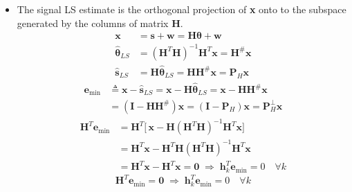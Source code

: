 \begin{itemize}
\[
\hat{\boldsymbol{\theta}}_{ML}
\in \mathcal{N}\big(\boldsymbol{\theta}, CRB(\boldsymbol{\theta})\big)
\]

\item The signal LS estimate is the orthogonal projection of \textbf{x} onto to the subspace generated by the columns of matrix \textbf{H}.
\begin{align*}
\mathbf{x}
&= \mathbf{s} + \mathbf{w}
 = \mathbf{H}\boldsymbol{\theta} + \mathbf{w} \\[4pt]
\hat{\boldsymbol{\theta}}_{LS}
&= (\mathbf{H}^{T}\mathbf{H})^{-1}\mathbf{H}^{T}\mathbf{x}
 = \mathbf{H}^{\#}\mathbf{x} \\[4pt]
\hat{\mathbf{s}}_{LS}
&= \mathbf{H}\hat{\boldsymbol{\theta}}_{LS}
 = \mathbf{H}\mathbf{H}^{\#}\mathbf{x}
 = \mathbf{P}_{\!H}\mathbf{x}
\end{align*}
\vspace{-1.5em}
\begin{align*}
\mathbf{e}_{\min}
&\triangleq \mathbf{x} - \hat{\mathbf{s}}_{LS}
 = \mathbf{x} - \mathbf{H}\hat{\boldsymbol{\theta}}_{LS}
 = \mathbf{x} - \mathbf{H}\mathbf{H}^{\#}\mathbf{x} \\[4pt]
&= (\mathbf{I} - \mathbf{H}\mathbf{H}^{\#})\mathbf{x}
 = (\mathbf{I} - \mathbf{P}_{\!H})\mathbf{x}
 = \mathbf{P}_{\!H}^{\perp}\mathbf{x}
\end{align*}
\vspace{-1.5em}
\begin{align*}
\mathbf{H}^{T}\mathbf{e}_{\min}
&= \mathbf{H}^{T}
   \Big[\, \mathbf{x}
        - \mathbf{H}(\mathbf{H}^{T}\mathbf{H})^{-1}\mathbf{H}^{T}\mathbf{x} \Big] \\[4pt]
&= \mathbf{H}^{T}\mathbf{x}
 - \mathbf{H}^{T}\mathbf{H}(\mathbf{H}^{T}\mathbf{H})^{-1}\mathbf{H}^{T}\mathbf{x} \\[4pt]
&= \mathbf{H}^{T}\mathbf{x} - \mathbf{H}^{T}\mathbf{x} = \mathbf{0}
\;\Rightarrow\;
\mathbf{h}_{k}^{T}\mathbf{e}_{\min} = 0 \quad \forall k
\end{align*}
\vspace{-1em}
\[
\mathbf{H}^{T}\mathbf{e}_{\min} = \mathbf{0}
\;\Rightarrow\;
\mathbf{h}_{k}^{T}\mathbf{e}_{\min} = 0 \quad \forall k
\]


\end{itemize}

